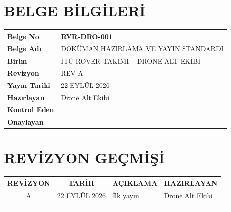 \documentclass[11pt,a4paper]{article}
\newcommand{\BelgeNo}{RVR-DRO-001}
\newcommand{\BelgeAdi}{DOKÜMAN HAZIRLAMA VE YAYIN STANDARDI}
\newcommand{\Revizyon}{REV A}
\newcommand{\YayinTarihi}{22 EYLÜL 2026}
\newcommand{\BirimAdi}{İTÜ ROVER TAKIMI -- DRONE ALT EKİBİ}
\begin{document}

\section*{BELGE BİLGİLERİ}

\begin{tabularx}{\textwidth}{|>{\bfseries}p{45mm}|X|}
\hline
Belge No & \BelgeNo \\
\hline
Belge Adı & \BelgeAdi \\
\hline
Birim & \BirimAdi \\
\hline
Revizyon & \Revizyon \\
\hline
Yayın Tarihi & \YayinTarihi \\
\hline
Hazırlayan & Drone Alt Ekibi \\
\hline
Kontrol Eden & \\
\hline
Onaylayan & \\
\hline
\end{tabularx}

\vspace{10mm}


\section*{REVİZYON GEÇMİŞİ}

\begin{tabularx}{\textwidth}{|c|c|X|X|}
\hline

\textbf{REVİZYON} &
\textbf{TARİH} &
\textbf{AÇIKLAMA} &
\textbf{HAZIRLAYAN}
\\
\hline

A &
22 EYLÜL 2026 &
İlk yayın &
Drone Alt Ekibi
\\
\hline

&
&
&
\\
\hline

&
&
&
\\
\hline

\end{tabularx}

\newpage

\end{document}

